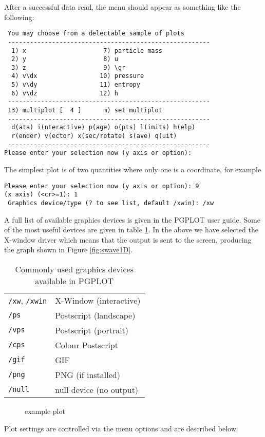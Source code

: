 \documentclass[a4paper,11pt]{article}
\begin{document}
After a successful data read, the menu should appear as something like the
following:
\begin{verbatim}
 You may choose from a delectable sample of plots
 -------------------------------------------------------
  1) x                     7) particle mass
  2) y                     8) u
  3) z                     9) \gr
  4) v\dx                 10) pressure
  5) v\dy                 11) entropy
  6) v\dz                 12) h
 -------------------------------------------------------
 13) multiplot [  4 ]      m) set multiplot
 -------------------------------------------------------
  d(ata) i(nteractive) p(age) o(pts) l(imits) h(elp)
  r(ender) v(ector) x(sec/rotate) s(ave) q(uit)
 -------------------------------------------------------
Please enter your selection now (y axis or option):
\end{verbatim}
The simplest plot is of two quantities where only one is a coordinate, for
example
\begin{verbatim}
Please enter your selection now (y axis or option): 9
(x axis) (<cr>=1): 1
 Graphics device/type (? to see list, default /xwin): /xw
\end{verbatim}
 A full list of available graphics devices is given in the PGPLOT user guide.
Some of the most useful devices are given in table \ref{tab:devices}. In the
above we have selected the X-window driver which means that the output is sent to the
screen, producing the graph shown in Figure \ref{fig:swave1D}.
\begin{table}[h]
\centering
\begin{tabular}{|l|l|}
\hline
\verb+/xw+, \verb+/xwin+ & X-Window (interactive) \\
\verb+/ps+ & Postscript (landscape) \\
\verb+/vps+ & Postscript (portrait) \\
\verb+/cps+ & Colour Postscript \\
\verb+/gif+ & GIF \\
\verb+/png+ & PNG (if installed) \\
\verb+/null+ & null device (no output) \\
\hline
\end{tabular}
\caption{Commonly used graphics devices available in PGPLOT}
\label{tab:devices}
\end{table}

\begin{figure}
\centering
\caption{example plot}
\end{figure}
 Plot settings are controlled via the menu options and are described below. 
\end{document}

